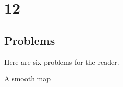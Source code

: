 \chapter{12}\label{ch-12}
\section*{Problems}
Here are six problems for the reader.

\begin{problem}\label{prob-12-C}
	A smooth map 
\end{problem}